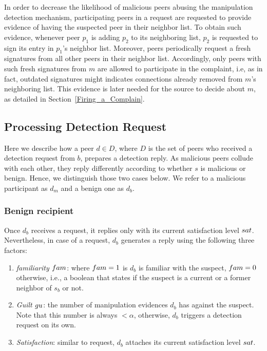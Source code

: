 In order to decrease the likelihood of malicious peers abusing the manipulation detection mechanism, participating peers in a \manp request are requested to provide evidence of having the suspected peer in their neighbor list.
To obtain such evidence, whenever peer $p_1$ is adding $p_2$ to its neighboring list, $p_2$ is requested to sign its entry in $p_1$'s neighbor list.
Moreover, peers periodically request a fresh signatures from all other peers in their neighbor list.
Accordingly, only peers with such fresh signatures from $m$ are allowed to participate in the complaint, i.e, as in fact, outdated signatures might indicates connections already removed from $m$'s neighboring list.
This evidence is later needed for the source to decide about $m$, as detailed in Section~\ref{Firing_a_Complain}.

\subsection{Processing Detection Request}
Here we describe how a peer $d \in D$, where $D$ is the set of peers who received a detection request from $b$, prepares a detection reply.
As malicious peers collude with each other, they reply differently according to whether $s$ is malicious or benign.
Hence, we distinguish those two cases below. We refer to a malicious participant as $d_m$ and a benign one as $d_b$.

\subsubsection*{Benign recipient}
Once $d_b$ receives a \drop request, it replies only with its current satisfaction level $sat$.
Nevertheless, in case of a \manp request, $d_b$ generates a reply using the following three factors:
\begin{enumerate}
 \item \textit{familiarity $fam$}: where $fam=1$ is $d_b$ is familiar with the suspect, $fam=0$ otherwise, i.e., a boolean that states if the suspect is a current or a former neighbor of $s_b$ or not.
 \item \textit{Guilt $gu$}: the number of manipulation evidences $d_b$ has against the suspect.
 Note that this number is always $<\alpha$, otherwise, $d_b$ triggers a detection request on its own.
 \item \textit{Satisfaction}: similar to \drop request, $d_b$ attaches its current satisfaction level $sat$.
\end{enumerate}


